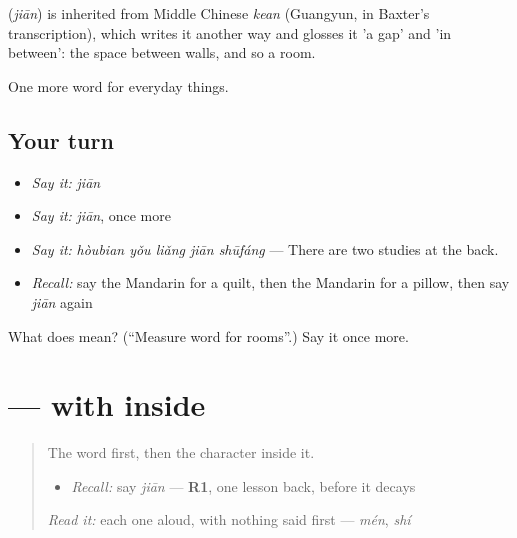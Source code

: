 \begin{cousinweb}
\textbf{} (\emph{jiān}) is inherited from Middle Chinese \emph{kean} (Guangyun, in Baxter's transcription), which writes it another way and glosses it 'a gap' and 'in between': the space between walls, and so a room.
\end{cousinweb}

\begin{grammarlens}[title={What you've built}]
One more word for everyday things.
\end{grammarlens}

\subsection*{Your turn}
\begin{itemize}
\raggedright
  \item \emph{Say it:} \emph{jiān}
  \item \emph{Say it:} \emph{jiān}, once more
  \item \emph{Say it:} \emph{hòubian yǒu liǎng jiān shūfáng} — There are two studies at the back.
  \item \emph{Recall:} say the Mandarin for a quilt, then the Mandarin for a pillow, then say \emph{jiān} again
\end{itemize}

\begin{tcolorbox}[breakable,colback=teal!4,colframe=teal!35!black,title={Before you move on}]
What does  mean? (\textquotedblleft{}Measure word for rooms\textquotedblright{}.) Say it once more.
\end{tcolorbox}
\section[\texorpdfstring{\zh{间} (jiān)}{间 (jiān)}]{ —  with  inside}

\label{lesson:ZH-W181-jian-room}



\begin{quote}
The word first, then the character inside it.

\begin{itemize}
\raggedright
  \item \emph{Recall:} say \emph{jiān} — \textbf{R1}, one lesson back, before it decays
\end{itemize}

\begin{quote}
 
\end{quote}

\emph{Read it:} each one aloud, with nothing said first — \emph{mén}, \emph{shí}
\end{quote}

